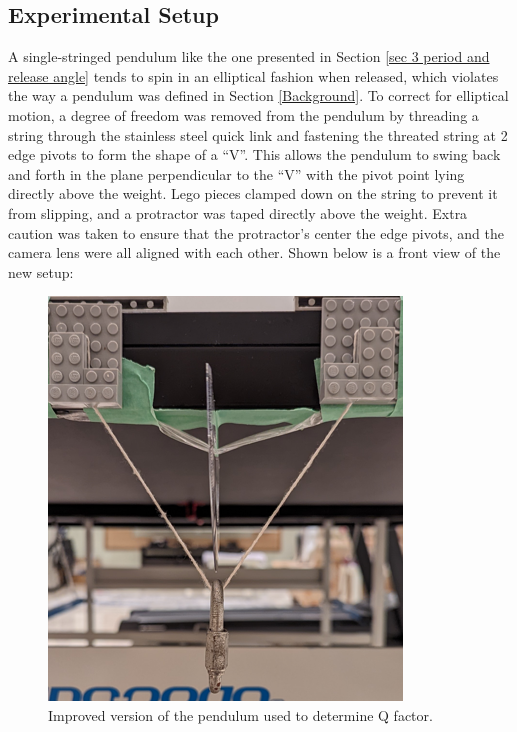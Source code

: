 \documentclass[11pt]{article}
\begin{document}
\begin{multicols}{2}
\subsection{Experimental Setup}
A single-stringed pendulum like the one presented in Section \ref{sec 3 period and release angle} tends to spin in an elliptical fashion when released, which violates the way a pendulum was defined in Section \ref{Background}. To correct for elliptical motion, a degree of freedom was removed from the pendulum by threading a string through the stainless steel quick link and fastening the threated string at 2 edge pivots to form the shape of a ``V''. This allows the pendulum to swing back and forth in the plane perpendicular to the ``V'' with the pivot point lying directly above the weight. Lego pieces clamped down on the string to prevent it from slipping, and a protractor was taped directly above the weight. Extra caution was taken to ensure that the protractor's center the edge pivots, and the camera lens were all aligned with each other. Shown below is a front view of the new setup:

\begin{figure}[H]
    \centering
    \includegraphics[width=\linewidth]{../figures/exp_setup3_front.png}
    \caption{\centering Improved version of the pendulum used to determine Q factor.}
    \label{fig:figure 3}
\end{figure}



\end{multicols}
\end{document}
